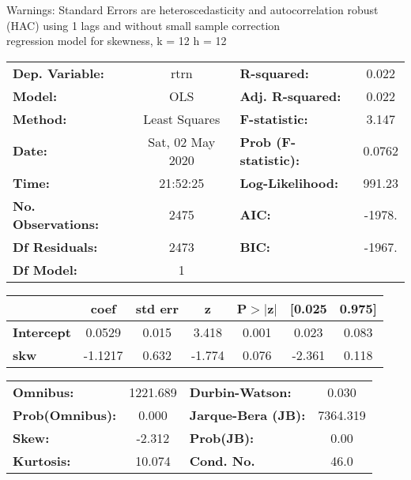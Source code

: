 Warnings: \newline
 [1] Standard Errors are heteroscedasticity and autocorrelation robust (HAC) using 1 lags and without small sample correction\\ 

regression model for skewness, k = 12 h = 12\begin{center}
\begin{tabular}{lclc}
\toprule
\textbf{Dep. Variable:}    &       rtrn       & \textbf{  R-squared:         } &     0.022   \\
\textbf{Model:}            &       OLS        & \textbf{  Adj. R-squared:    } &     0.022   \\
\textbf{Method:}           &  Least Squares   & \textbf{  F-statistic:       } &     3.147   \\
\textbf{Date:}             & Sat, 02 May 2020 & \textbf{  Prob (F-statistic):} &   0.0762    \\
\textbf{Time:}             &     21:52:25     & \textbf{  Log-Likelihood:    } &    991.23   \\
\textbf{No. Observations:} &        2475      & \textbf{  AIC:               } &    -1978.   \\
\textbf{Df Residuals:}     &        2473      & \textbf{  BIC:               } &    -1967.   \\
\textbf{Df Model:}         &           1      & \textbf{                     } &             \\
\bottomrule
\end{tabular}
\begin{tabular}{lcccccc}
                   & \textbf{coef} & \textbf{std err} & \textbf{z} & \textbf{P$> |$z$|$} & \textbf{[0.025} & \textbf{0.975]}  \\
\midrule
\textbf{Intercept} &       0.0529  &        0.015     &     3.418  &         0.001        &        0.023    &        0.083     \\
\textbf{skw}       &      -1.1217  &        0.632     &    -1.774  &         0.076        &       -2.361    &        0.118     \\
\bottomrule
\end{tabular}
\begin{tabular}{lclc}
\textbf{Omnibus:}       & 1221.689 & \textbf{  Durbin-Watson:     } &    0.030  \\
\textbf{Prob(Omnibus):} &   0.000  & \textbf{  Jarque-Bera (JB):  } & 7364.319  \\
\textbf{Skew:}          &  -2.312  & \textbf{  Prob(JB):          } &     0.00  \\
\textbf{Kurtosis:}      &  10.074  & \textbf{  Cond. No.          } &     46.0  \\
\bottomrule
\end{tabular}
\end{center}

